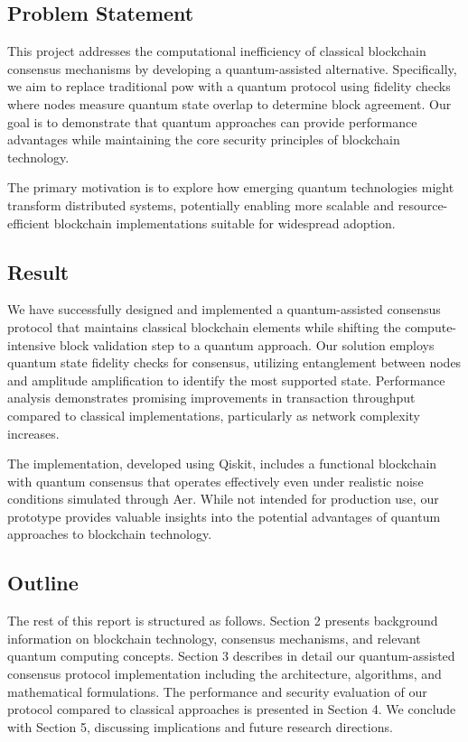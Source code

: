 \documentclass[11pt,a4paper]{article}
\begin{document}
\subsection{Problem Statement}
This project addresses the computational inefficiency of classical blockchain consensus mechanisms by developing a quantum-assisted alternative. Specifically, we aim to replace traditional \gls{pow} with a quantum protocol using \gls{fidelity} checks where nodes measure quantum state overlap to determine block agreement. Our goal is to demonstrate that quantum approaches can provide performance advantages while maintaining the core security principles of blockchain technology.

The primary motivation is to explore how emerging quantum technologies might transform distributed systems, potentially enabling more scalable and resource-efficient blockchain implementations suitable for widespread adoption.

\subsection{Result}
We have successfully designed and implemented a quantum-assisted consensus protocol that maintains classical blockchain elements while shifting the compute-intensive block validation step to a quantum approach. Our solution employs quantum state fidelity checks for consensus, utilizing entanglement between nodes and amplitude amplification to identify the most supported state. Performance analysis demonstrates promising improvements in transaction throughput compared to classical implementations, particularly as network complexity increases.

The implementation, developed using Qiskit, includes a functional blockchain with quantum consensus that operates effectively even under realistic noise conditions simulated through Aer. While not intended for production use, our prototype provides valuable insights into the potential advantages of quantum approaches to blockchain technology.

\subsection{Outline}
The rest of this report is structured as follows. Section 2 presents background information on blockchain technology, consensus mechanisms, and relevant quantum computing concepts. Section 3 describes in detail our quantum-assisted consensus protocol implementation including the architecture, algorithms, and mathematical formulations. The performance and security evaluation of our protocol compared to classical approaches is presented in Section 4. We conclude with Section 5, discussing implications and future research directions.
\end{document}
